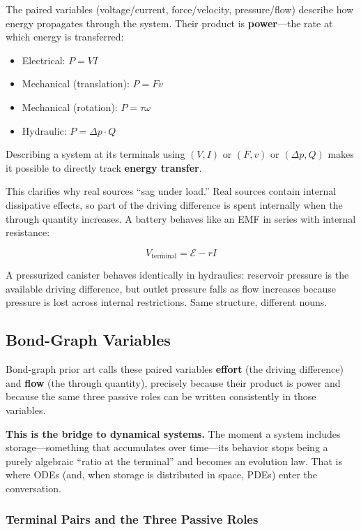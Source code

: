 \documentclass[
]{article}
\providecommand{\tightlist}{%
  \setlength{\itemsep}{0pt}\setlength{\parskip}{0pt}}
\begin{document}
The paired variables (voltage/current, force/velocity, pressure/flow)
describe how energy propagates through the system. Their product is
\textbf{power}---the rate at which energy is transferred:

\begin{itemize}
\tightlist
\item
  Electrical: \(P = VI\)
\item
  Mechanical (translation): \(P = Fv\)
\item
  Mechanical (rotation): \(P = \tau\omega\)
\item
  Hydraulic: \(P = \Delta p \cdot Q\)
\end{itemize}

Describing a system at its terminals using \((V, I)\) or \((F, v)\) or
\((\Delta p, Q)\) makes it possible to directly track \textbf{energy
transfer}.

This clarifies why real sources ``sag under load.'' Real sources contain
internal dissipative effects, so part of the driving difference is spent
internally when the through quantity increases. A battery behaves like
an EMF in series with internal resistance:

\[V_{\text{terminal}} = \mathcal{E} - rI\]

A pressurized canister behaves identically in hydraulics: reservoir
pressure is the available driving difference, but outlet pressure falls
as flow increases because pressure is lost across internal restrictions.
Same structure, different nouns.

\subsection{Bond-Graph Variables}\label{bond-graph-variables}

Bond-graph prior art calls these paired variables \textbf{effort} (the
driving difference) and \textbf{flow} (the through quantity), precisely
because their product is power and because the same three passive roles
can be written consistently in those variables.

\textbf{This is the bridge to dynamical systems.} The moment a system
includes storage---something that accumulates over time---its behavior
stops being a purely algebraic ``ratio at the terminal'' and becomes an
evolution law. That is where ODEs (and, when storage is distributed in
space, PDEs) enter the conversation.

\subsubsection{Terminal Pairs and the Three Passive
Roles}\label{terminal-pairs-and-the-three-passive-roles}
\end{document}
